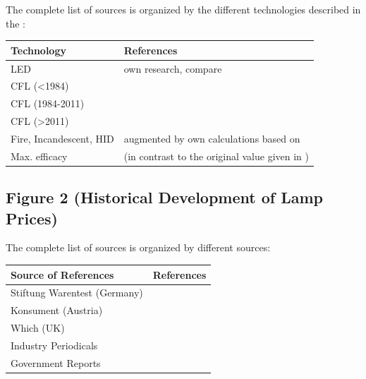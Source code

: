 \documentclass[10pt]{article}
\begin{document}
The complete list of sources is organized by the different technologies described in the :

\begin{table}[h!]
    \begin{tabularx}{\textwidth}{|l|X|}
    \hline
    \textbf{Technology} & \textbf{References} \\
    \hline
    LED & own research, compare \cite{zenodo_weinold_led_history} \\
    \hline
    CFL (<1984) & \cite{Bouwknegt1982}\cite{Vrenken1983} \\
    \hline
    CFL (1984-2011) & \cite{eger2018origin} \\
    \hline
    CFL (>2011) & \cite{Guan2015} \\
    \hline
    Fire, Incandescent, HID & \cite{azevedo2009transition} augmented by own calculations based on \cite{benesch1905beleuchtungswesen} \\
    \hline
    Max. efficacy & \cite{Murphy2012} (in contrast to the original value given in \cite{azevedo2009transition}) \\
    \hline
    \end{tabularx}
\end{table}

\subsection{Figure 2 (Historical Development of Lamp Prices)}

The complete list of sources is organized by different sources:

\begin{table}[h!]
    \begin{tabularx}{\textwidth}{|l|X|}
    \hline
    \textbf{Source of References} & \textbf{References} \\
    \hline
    Stiftung Warentest (Germany) & \cite{Warentest2008}\cite{Warentest2009_1}\cite{Warentest2009_2}\cite{Warentest2010_1}\cite{Warentest2010_2}\cite{Warentest2011}\cite{Warentest2012}\cite{Warentest2013}\cite{Warentest2014_1}\cite{Warentest2014_2}\cite{Warentest2015}\cite{Warentest2016_1}\cite{Warentest2016_2}\cite{Warentest2018} \\
    \hline
    Konsument (Austria) & \cite{Konsument2010} \\
    \hline
    Which (UK) & \cite{Which2020} \\
    \hline
    Industry Periodicals & \cite{PM2020} \\
    \hline
    Government Reports & \cite{council2013assessment} \\
    \hline
    \end{tabularx}
\end{table}
\end{document}
